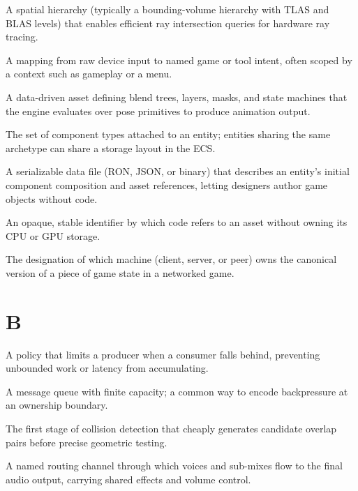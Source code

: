 \documentclass[
  11pt,
  letterpaper,
  DIV=11,
  numbers=noendperiod,
  twoside,
  open=right]{scrreprt}
\providecommand{\tightlist}{%
  \setlength{\itemsep}{0pt}\setlength{\parskip}{0pt}}
\begin{document}
\begin{description}
\tightlist
\item[\textbf{Acceleration structure}]
A spatial hierarchy (typically a bounding-volume hierarchy with TLAS and
BLAS levels) that enables efficient ray intersection queries for
hardware ray tracing.
\item[\textbf{Action map}]
A mapping from raw device input to named game or tool intent, often
scoped by a context such as gameplay or a menu.
\item[\textbf{Animation graph}]
A data-driven asset defining blend trees, layers, masks, and state
machines that the engine evaluates over pose primitives to produce
animation output.
\item[\textbf{Archetype}]
The set of component types attached to an entity; entities sharing the
same archetype can share a storage layout in the ECS.
\item[\textbf{Asset descriptor}]
A serializable data file (RON, JSON, or binary) that describes an
entity's initial component composition and asset references, letting
designers author game objects without code.
\item[\textbf{Asset handle}]
An opaque, stable identifier by which code refers to an asset without
owning its CPU or GPU storage.
\item[\textbf{Authority}]
The designation of which machine (client, server, or peer) owns the
canonical version of a piece of game state in a networked game.
\end{description}

\section*{B}\label{b}


\begin{description}
\tightlist
\item[\textbf{Backpressure}]
A policy that limits a producer when a consumer falls behind, preventing
unbounded work or latency from accumulating.
\item[\textbf{Bounded channel}]
A message queue with finite capacity; a common way to encode
backpressure at an ownership boundary.
\item[\textbf{Broad phase}]
The first stage of collision detection that cheaply generates candidate
overlap pairs before precise geometric testing.
\item[\textbf{Bus (audio)}]
A named routing channel through which voices and sub-mixes flow to the
final audio output, carrying shared effects and volume control.
\end{description}
\end{document}
